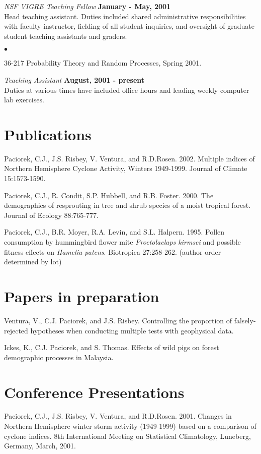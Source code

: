 \documentclass[margin,line]{res}
\newenvironment{list2}{
  \begin{list}{$\bullet$}{%
      \setlength{\itemsep}{0in}
      \setlength{\parsep}{0in} \setlength{\parskip}{0in}
      \setlength{\topsep}{0in} \setlength{\partopsep}{0in} 
      \setlength{\leftmargin}{0.2in}}}{\end{list}}
\begin{document}
\begin{resume}
{\em NSF VIGRE Teaching Fellow} \hfill {\bf January - May, 2001}\\
Head teaching assistant.   
Duties included  shared administrative responsibilities with faculty
instructor, fielding of all student inquiries, and oversight of
graduate student teaching assistants and graders.
\vspace*{.05in}  
\begin{list2}
\item 36-217 Probability Theory and Random Processes, Spring 2001.
\end{list2}

{\em Teaching Assistant} \hfill {\bf August, 2001  - present}\\
Duties at various times have included 
office hours and leading weekly computer lab exercises.



\section{\sc Publications}
Paciorek, C.J., J.S. Risbey, V. Ventura, and R.D.Rosen. 2002. Multiple indices of Northern Hemisphere Cyclone
Activity, Winters 1949-1999. Journal of Climate 15:1573-1590.

Paciorek, C.J., R. Condit, S.P. Hubbell, and R.B. Foster.  2000.
The demographics of resprouting in tree and shrub species of a moist
tropical forest.  Journal of Ecology 88:765-777.

Paciorek, C.J., B.R. Moyer, R.A. Levin, and S.L. Halpern.  1995.
Pollen consumption by hummingbird flower mite {\it Proctolaelaps
  kirmsei} and possible fitness effects on {\it Hamelia patens}.
Biotropica 27:258-262.  (author order determined by lot)     

\section{\sc Papers in preparation}

Ventura, V., C.J. Paciorek, and J.S. Risbey.  Controlling the proportion of falsely-rejected hypotheses when conducting multiple tests with geophysical data.

Ickes, K., C.J. Paciorek, and S. Thomas.  Effects of wild pigs on
forest demographic processes in Malaysia.

\section{\sc Conference Presentations}
Paciorek, C.J., J.S. Risbey, V. Ventura, and R.D.Rosen.  2001.  Changes in Northern Hemisphere winter storm activity (1949-1999) based
on a comparison of cyclone indices.  8th International Meeting on
Statistical Climatology, Luneberg, Germany, March, 2001.


\end{resume}
\end{document}
